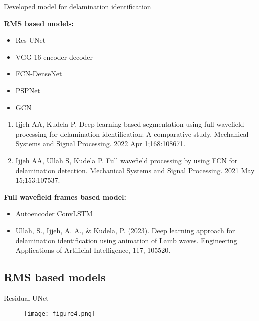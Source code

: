 \documentclass[10pt,aspectratio=169,dvipsnames]{beamer} %
\begin{document}
\begin{frame}{Developed model for delamination identification}
	\begin{minipage}[t]{0.45\textwidth}
		\textbf{RMS based models: \\}
			\begin{itemize}
				\item Res-UNet
				\item VGG 16 encoder-decoder
				\item FCN-DenseNet
				\item PSPNet
				\item GCN
			\end{itemize}
		{\tiny 
			\begin{enumerate}
				\item Ijjeh AA, Kudela P. Deep learning based segmentation using full wavefield processing for delamination identification: A comparative study. Mechanical Systems and Signal Processing. 2022 Apr 1;168:108671.
				\item Ijjeh AA, Ullah S, Kudela P. Full wavefield processing by using FCN for delamination detection. Mechanical Systems and Signal Processing. 2021 May 15;153:107537.
				
			\end{enumerate}}
	\end{minipage}
	\hfill
	\begin{minipage}[t]{.45\textwidth}
	\textbf{Full wavefield frames based model:}
		\begin{itemize}
			\item Autoencoder ConvLSTM
		\end{itemize}
	\tiny
	\begin{itemize}
		\item Ullah, S., Ijjeh, A. A., \& Kudela, P. (2023). Deep learning approach for delamination identification using animation of Lamb waves. Engineering Applications of Artificial Intelligence, 117, 105520.
	\end{itemize}
	
	\end{minipage}
\end{frame}

\setcounter{subfigure}{0}
\subsection{RMS based models}

\begin{frame}{Residual UNet}
	\begin{figure}
		\centering
		\texttt{[image: figure4.png]}
	\end{figure}
\end{frame}
\end{document}
